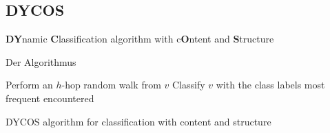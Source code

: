 \subsection{DYCOS}
\begin{frame}{}
    \begin{center}
    \Huge
    \textbf{DY}namic \textbf{C}lassification algorithm with 
    c\textbf{O}ntent and \textbf{S}tructure
    \end{center}
\end{frame}

\begin{frame}{Der Algorithmus}
\begin{algorithm}[H]
	\begin{algorithmic}
			 
				    \State Perform an $h$-hop random walk from $v$
			    \EndFor
                \State Classify $v$ with the class labels most frequent
                       encountered
			\EndFor
		\EndFunction
	\end{algorithmic}
\caption{DYCOS algorithm for classification with content and structure}
\label{alg:seq1}
\end{algorithm}
\end{frame}


